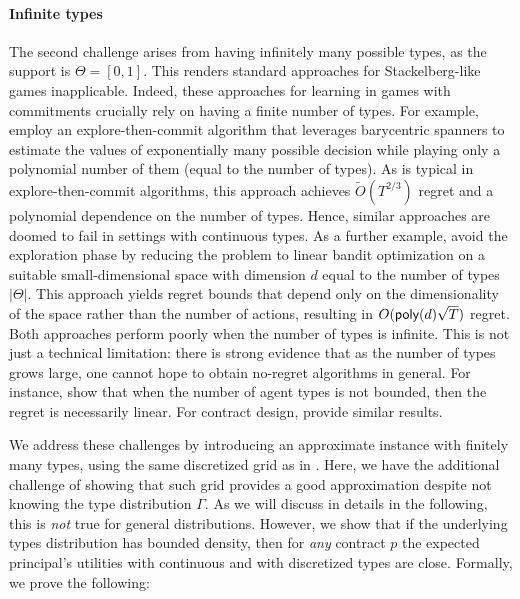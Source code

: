 \paragraph{Infinite types} The second challenge arises from having infinitely many possible types, as the support is $\Theta=[0,1]$. This renders standard approaches for Stackelberg-like games inapplicable. Indeed, these approaches for learning in games with commitments crucially rely on having a finite number of types.
%
For example, \citet{balcan2015commitment} employ an explore-then-commit algorithm that leverages barycentric spanners to estimate the values of exponentially many possible decision while playing only a polynomial number of them (equal to the number of types). As is typical in explore-then-commit algorithms, this approach achieves $    \widetilde O(T^{2/3})$ regret and a polynomial dependence on the number of types. Hence, similar approaches are doomed to fail in settings with continuous types.
%
As a further example, \citet{bernasconi2023optimal} avoid the exploration phase by reducing the problem to linear bandit optimization on a suitable small-dimensional space with dimension $d$ equal to the number of types $|\Theta|$. This approach yields regret bounds that depend only on the dimensionality of the space rather than the number of actions, resulting in $O(\textsf{poly}(d)\sqrt{T})$ regret.
%
Both approaches perform poorly when the number of types is infinite. This is not just a technical limitation: there is strong evidence that as the number of types grows large, one cannot hope to obtain no-regret algorithms in general. For instance, \citet[Theorem~7.1]{balcan2015commitment} show that when the number of agent types is not bounded, then the regret is necessarily linear. For contract design, \citet{zhu2022online} provide similar results.

We address these challenges by introducing an approximate instance with finitely many types, using the same discretized grid as in .
Here, we have the additional challenge of showing that such grid provides a good approximation despite not knowing the type distribution $\Gamma$. 
As we will discuss in details in the following, this is \emph{not} true for general distributions.
However, we show that if the underlying types distribution has bounded density, then for \emph{any} contract $p$ the expected principal's utilities with continuous and with discretized types are close.
Formally, we prove the following:



